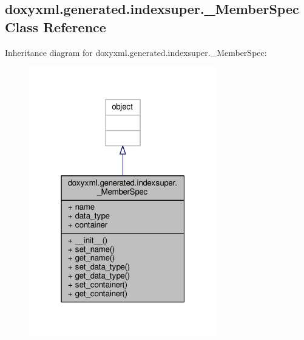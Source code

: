 \subsection{doxyxml.\+generated.\+indexsuper.\+\_\+\+Member\+Spec Class Reference}
\label{classdoxyxml_1_1generated_1_1indexsuper_1_1__MemberSpec}


Inheritance diagram for doxyxml.\+generated.\+indexsuper.\+\_\+\+Member\+Spec\+:
\nopagebreak
\begin{figure}[H]
\begin{center}
\leavevmode
\includegraphics[width=232pt]{d7/dc5/classdoxyxml_1_1generated_1_1indexsuper_1_1__MemberSpec__inherit__graph}
\end{center}
\end{figure}


